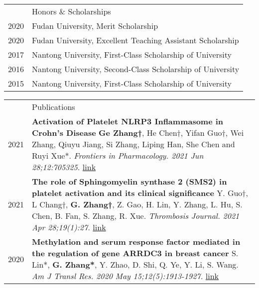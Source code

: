 \documentclass[letterpaper, 11pt]{article}
\newcommand{\headingfont}{\Large\color{LimeGreen}}
\newenvironment{SectionTable}[1]{
	\renewcommand*{\arraystretch}{1.7}
	\setlength{\tabcolsep}{10pt}
	\begin{longtable}{Rp{5.2in}} & #1 \\}
{\end{longtable}\vspace{-.3cm}}
\newenvironment{SectionTableSingleSpace}[1]{
	\renewcommand*{\arraystretch}{1.2}
	\setlength{\tabcolsep}{10pt}
	\begin{longtable}{Rp{5.2in}} & #1 \\[0.6em]}
{\end{longtable}\vspace{-.3cm}}
\begin{document}

\begin{SectionTableSingleSpace}{\headingfont Honors \& Scholarships}
2020 & 
Fudan University, Merit Scholarship \\

2020 &
Fudan University, Excellent Teaching Assistant Scholarship \\

2017 &
Nantong University, First-Class Scholarship of University \\

2016 &
Nantong University, Second-Class Scholarship of University  \\

2015 &
Nantong University, First-Class Scholarship of University 
\end{SectionTableSingleSpace}


\begin{SectionTable}{\headingfont Publications} 
2021 & 
\textbf{Activation of Platelet NLRP3 Inflammasome in Crohn's Disease} \newline
\textbf{Ge Zhang†}, He Chen†, Yifan Guo†, Wei Zhang, Qiuyu Jiang, Si Zhang, Liping Han, She Chen and Ruyi Xue*. \newline
\textit{Frontiers in Pharmacology. 2021 Jun 28;12:705325.} \href{https://pubmed.ncbi.nlm.nih.gov/34262463/}{link} \\

2021 & 
\textbf{The role of Sphingomyelin synthase 2 (SMS2) in platelet activation and its clinical significance} \newline
Y. Guo†, L Chang†, \textbf{G. Zhang†}, Z. Gao, H. Lin, Y. Zhang, L. Hu, S. Chen, B. Fan, S. Zhang, R. Xue. \newline
\textit{Thrombosis Journal. 2021 Apr 28;19(1):27.} \href{https://pubmed.ncbi.nlm.nih.gov/34262463/}{link} \\

2020 & 
\textbf{Methylation and serum response factor mediated in the regulation of gene ARRDC3 in breast cancer} \newline
S. Lin*, \textbf{G. Zhang*}, Y. Zhao, D. Shi, Q. Ye, Y. Li, S. Wang. \newline
\textit{Am J Transl Res. 2020 May 15;12(5):1913-1927.} \href{https://pubmed.ncbi.nlm.nih.gov/32509187/}{link}
\end{SectionTable}

\end{document}

